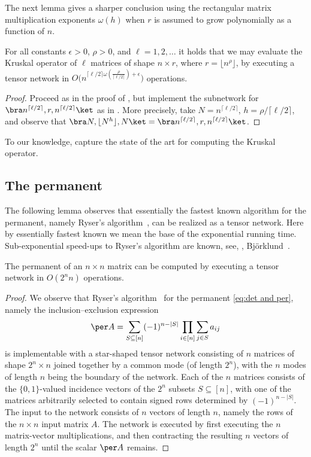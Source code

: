 The next lemma gives a sharper conclusion using the rectangular matrix
multiplication exponents $\omega(h)$ when $r$ is assumed to grow
polynomially as a function of $n$.

\begin{lemma}
\label{lem:kruskal-2}
For all constants $\epsilon>0$, $\rho>0$, and $\ell=1,2,\ldots$
it holds that we may evaluate the Kruskal operator
of $\ell$ matrices of shape $n\times r$, where $r=\lfloor n^\rho\rfloor$,
by executing a tensor network in
$O\bigl(n^{\lceil\ell/2\rceil\omega\left(\frac{\rho}{\lceil\ell/2\rceil}\right)+\epsilon}\bigr)$ operations.
\end{lemma}
\begin{proof}
Proceed as in the proof of , but implement the subnetwork
for $\bra n^{\lceil\ell/2\rceil},r,n^{\lceil\ell/2\rceil}\ket$ as in
.
More precisely, take $N=n^{\lceil\ell/2\rceil}$, $h=\rho/\lceil\ell/2\rceil$,
and observe that
$\bra N,\lfloor N^h\rfloor,N\ket=\bra n^{\lceil\ell/2\rceil},r,n^{\lceil\ell/2\rceil}\ket$.
\end{proof}

To our knowledge,
%
capture the state of the art for
computing the Kruskal operator.

\subsection{The permanent}

The following lemma observes that essentially the fastest known algorithm
for the permanent, namely Ryser's algorithm~\cite{Ryser1963}, can be
realized as a tensor network. Here by essentially fastest known we
mean the base of the exponential running time. Sub-exponential speed-ups
to Ryser's algorithm are known, see, \eg, Bj\"orklund~\cite{Bjorklund2016}.

\begin{lemma}
The permanent of an $n\times n$ matrix can be computed by executing
a tensor network in $O(2^nn)$ operations.
\end{lemma}
\begin{proof}
We observe that Ryser's algorithm~\cite{Ryser1963} for the
permanent \eqref{eq:det and per}, namely the inclusion--exclusion expression
\[
\per A=\sum_{S\subseteq [n]}(-1)^{n-|S|}\prod_{i\in [n]}\sum_{j\in S}a_{ij}
\]
is implementable with a star-shaped tensor network consisting of
$n$ matrices of shape $2^n\times n$ joined together by a common mode (of length $2^n$), with the $n$ modes of length $n$ being the boundary of the network.
Each of the $n$ matrices consists of the $\{0,1\}$-valued incidence vectors of
the $2^n$ subsets $S\subseteq [n]$, with one of the matrices arbitrarily
selected to contain signed rows determined by $(-1)^{n-|S|}$.
The input to the network consists of $n$ vectors of length $n$,
namely the rows of the $n\times n$ input matrix $A$. The network is executed
by first executing the $n$ matrix-vector multiplications, and then contracting
the resulting $n$ vectors of length $2^n$ until the scalar $\per A$ remains.
\end{proof}




